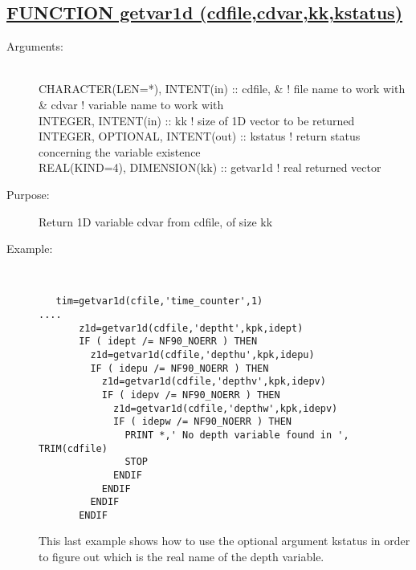 \documentclass[a4paper,11pt]{article}
\begin{document}
\subsection*{\underline{FUNCTION getvar1d (cdfile,cdvar,kk,kstatus) }}
\begin{description}
\item[Arguments:] \ \\
    CHARACTER(LEN=*), INTENT(in) :: cdfile,     \&   ! file name to work with \\
         \&                          cdvar           ! variable name to work with \\
    INTEGER, INTENT(in) :: kk                       ! size of 1D vector to be returned \\
    INTEGER, OPTIONAL, INTENT(out) :: kstatus       ! return status concerning the variable existence \\
    REAL(KIND=4), DIMENSION(kk) :: getvar1d         ! real returned vector \\
\item[Purpose:]  Return 1D variable cdvar from cdfile, of size kk
\item[Example:]\ \\
\begin{verbatim}
   tim=getvar1d(cfile,'time_counter',1)
....
       z1d=getvar1d(cdfile,'deptht',kpk,idept)
       IF ( idept /= NF90_NOERR ) THEN
         z1d=getvar1d(cdfile,'depthu',kpk,idepu)
         IF ( idepu /= NF90_NOERR ) THEN
           z1d=getvar1d(cdfile,'depthv',kpk,idepv)
           IF ( idepv /= NF90_NOERR ) THEN
             z1d=getvar1d(cdfile,'depthw',kpk,idepv)
             IF ( idepw /= NF90_NOERR ) THEN
               PRINT *,' No depth variable found in ', TRIM(cdfile)
               STOP
             ENDIF
           ENDIF
         ENDIF
       ENDIF
\end{verbatim}
This last example shows how to use the optional argument kstatus in order to figure out which is the real name
of the depth variable.
\end{description}
\newpage
\end{document}
